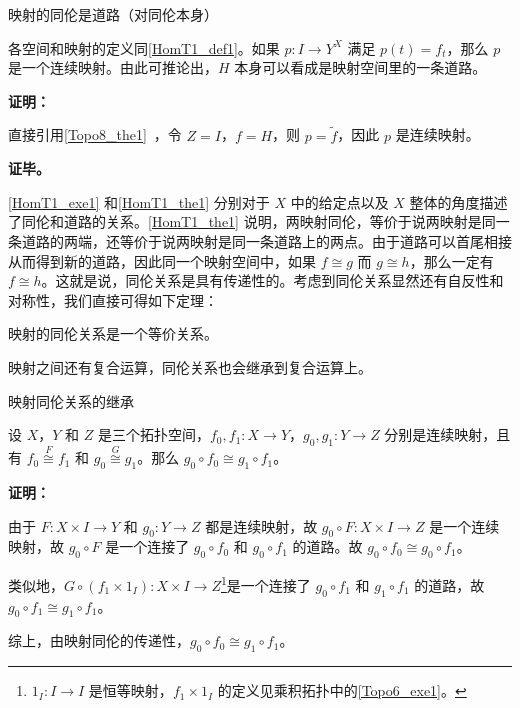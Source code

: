 \begin{theorem}{映射的同伦是道路（对同伦本身）}\label{HomT1_the1}

各空间和映射的定义同\autoref{HomT1_def1}。如果 $p:I\rightarrow Y^X$ 满足 $p(t)=f_t$，那么 $p$ 是一个连续映射。由此可推论出，$H$ 本身可以看成是映射空间里的一条道路。

\end{theorem}

\textbf{证明：}

直接引用\autoref{Topo8_the1}~，令 $Z=I$，$f=H$，则 $p=\widetilde{f}$，因此 $p$ 是连续映射。

\textbf{证毕。}

\autoref{HomT1_exe1} 和\autoref{HomT1_the1} 分别对于 $X$ 中的给定点以及 $X$ 整体的角度描述了同伦和道路的关系。\autoref{HomT1_the1} 说明，两映射同伦，等价于说两映射是同一条道路的两端，还等价于说两映射是同一条道路上的两点。由于道路可以首尾相接从而得到新的道路，因此同一个映射空间中，如果 $f\cong g$ 而 $g\cong h$，那么一定有 $f\cong h$。这就是说，同伦关系是具有传递性的。考虑到同伦关系显然还有自反性和对称性，我们直接可得如下定理：

\begin{theorem}{}
映射的同伦关系是一个等价关系。
\end{theorem}

映射之间还有复合运算，同伦关系也会继承到复合运算上。

\begin{theorem}{映射同伦关系的继承}\label{HomT1_the2}

设 $X$，$Y$ 和 $Z$ 是三个拓扑空间，$f_0, f_1:X\rightarrow Y$，$g_0, g_1:Y\rightarrow Z$ 分别是连续映射，且有 $f_0\overset{F}{\cong}f_1$ 和 $g_0\overset{G}{\cong}g_1$。那么 $g_0\circ f_0\cong g_1\circ f_1$。

\end{theorem}

\textbf{证明：}

由于 $F:X\times I\rightarrow Y$ 和 $g_0:Y\rightarrow Z$ 都是连续映射，故 $g_0\circ F:X\times I\rightarrow Z$ 是一个连续映射，故 $g_0\circ F$ 是一个连接了 $g_0\circ f_0$ 和 $g_0\circ f_1$ 的道路。故 $g_0\circ f_0\cong g_0\circ f_1$。

类似地，$G \circ (f_1 \times 1_I): X \times I \rightarrow Z$\footnote{$1_I:I\rightarrow I$ 是恒等映射，$f_1 \times 1_I$ 的定义见乘积拓扑中的\autoref{Topo6_exe1}。}是一个连接了 $g_0 \circ f_1$ 和 $g_1\circ f_1$ 的道路，故 $g_0 \circ f_1\cong g_1 \circ f_1$。

综上，由映射同伦的传递性，$g_0 \circ f_0\cong g_1 \circ f_1$。

